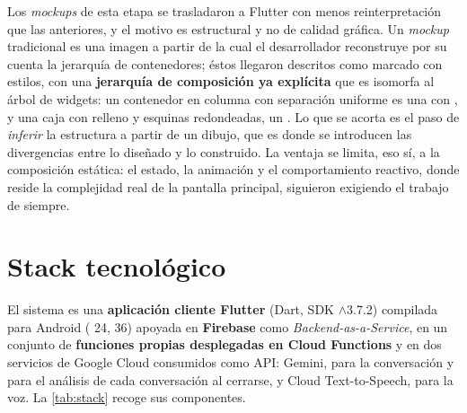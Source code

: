 Los \emph{mockups} de esta etapa se trasladaron a Flutter con menos reinterpretación que las anteriores, y
el motivo es estructural y no de calidad gráfica. Un \emph{mockup} tradicional es una imagen a partir de la
cual el desarrollador reconstruye por su cuenta la jerarquía de contenedores; éstos llegaron descritos como
marcado con estilos, con una \textbf{jerarquía de composición ya explícita} que es isomorfa al árbol de
widgets: un contenedor en columna con separación uniforme es una  con , y una
caja con relleno y esquinas redondeadas, un . Lo que se acorta es el paso de \emph{inferir}
la estructura a partir de un dibujo, que es donde se introducen las divergencias entre lo diseñado y lo
construido. La ventaja se limita, eso sí, a la composición estática: el estado, la animación y el
comportamiento reactivo, donde reside la complejidad real de la pantalla principal, siguieron exigiendo el
trabajo de siempre.


\section{Stack tecnológico}
\label{sec:stack}

El sistema es una \textbf{aplicación cliente Flutter} (Dart, SDK $\wedge$3.7.2) compilada para Android
( 24,  36) apoyada en \textbf{Firebase} como \emph{Backend-as-a-Service}, en
un conjunto de \textbf{funciones propias desplegadas en Cloud Functions} y en dos servicios de Google Cloud
consumidos como API: Gemini, para la conversación y para el análisis de cada conversación al cerrarse, y
Cloud Text-to-Speech, para la voz. La \autoref{tab:stack} recoge sus componentes.


